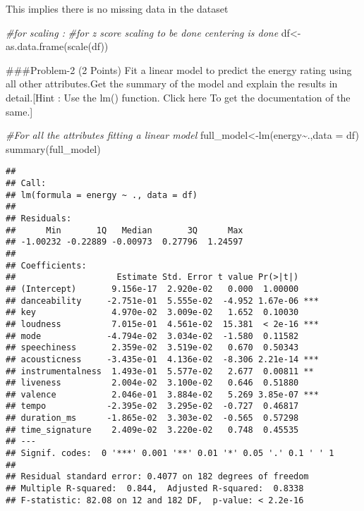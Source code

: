 \documentclass[
]{article}
\newenvironment{Shaded}{\begin{snugshade}}{\end{snugshade}}
\newcommand{\AttributeTok}[1]{\textcolor[rgb]{0.77,0.63,0.00}{#1}}
\newcommand{\CommentTok}[1]{\textcolor[rgb]{0.56,0.35,0.01}{\textit{#1}}}
\newcommand{\FunctionTok}[1]{\textcolor[rgb]{0.00,0.00,0.00}{#1}}
\newcommand{\NormalTok}[1]{#1}
\newcommand{\OtherTok}[1]{\textcolor[rgb]{0.56,0.35,0.01}{#1}}
\newcommand{\SpecialCharTok}[1]{\textcolor[rgb]{0.00,0.00,0.00}{#1}}
\begin{document}
This implies there is no missing data in the dataset

\begin{Shaded}
\begin{Highlighting}[]
\CommentTok{\#for scaling : }
\CommentTok{\#for z score scaling to be done centering is done}
\NormalTok{df}\OtherTok{\textless{}{-}}\FunctionTok{as.data.frame}\NormalTok{(}\FunctionTok{scale}\NormalTok{(df))}
\end{Highlighting}
\end{Shaded}

\#\#\#Problem-2 (2 Points) Fit a linear model to predict the energy
rating using all other attributes.Get the summary of the model and
explain the results in detail.{[}Hint : Use the lm() function. Click
here To get the documentation of the same.{]}

\begin{Shaded}
\begin{Highlighting}[]
\CommentTok{\#For all the attributes fitting a linear model}
\NormalTok{full\_model}\OtherTok{\textless{}{-}}\FunctionTok{lm}\NormalTok{(energy}\SpecialCharTok{\textasciitilde{}}\NormalTok{.,}\AttributeTok{data =}\NormalTok{ df)}
\FunctionTok{summary}\NormalTok{(full\_model)}
\end{Highlighting}
\end{Shaded}

\begin{verbatim}
## 
## Call:
## lm(formula = energy ~ ., data = df)
## 
## Residuals:
##      Min       1Q   Median       3Q      Max 
## -1.00232 -0.22889 -0.00973  0.27796  1.24597 
## 
## Coefficients:
##                    Estimate Std. Error t value Pr(>|t|)    
## (Intercept)       9.156e-17  2.920e-02   0.000  1.00000    
## danceability     -2.751e-01  5.555e-02  -4.952 1.67e-06 ***
## key               4.970e-02  3.009e-02   1.652  0.10030    
## loudness          7.015e-01  4.561e-02  15.381  < 2e-16 ***
## mode             -4.794e-02  3.034e-02  -1.580  0.11582    
## speechiness       2.359e-02  3.519e-02   0.670  0.50343    
## acousticness     -3.435e-01  4.136e-02  -8.306 2.21e-14 ***
## instrumentalness  1.493e-01  5.577e-02   2.677  0.00811 ** 
## liveness          2.004e-02  3.100e-02   0.646  0.51880    
## valence           2.046e-01  3.884e-02   5.269 3.85e-07 ***
## tempo            -2.395e-02  3.295e-02  -0.727  0.46817    
## duration_ms      -1.865e-02  3.303e-02  -0.565  0.57298    
## time_signature    2.409e-02  3.220e-02   0.748  0.45535    
## ---
## Signif. codes:  0 '***' 0.001 '**' 0.01 '*' 0.05 '.' 0.1 ' ' 1
## 
## Residual standard error: 0.4077 on 182 degrees of freedom
## Multiple R-squared:  0.844,  Adjusted R-squared:  0.8338 
## F-statistic: 82.08 on 12 and 182 DF,  p-value: < 2.2e-16
\end{verbatim}
\end{document}

